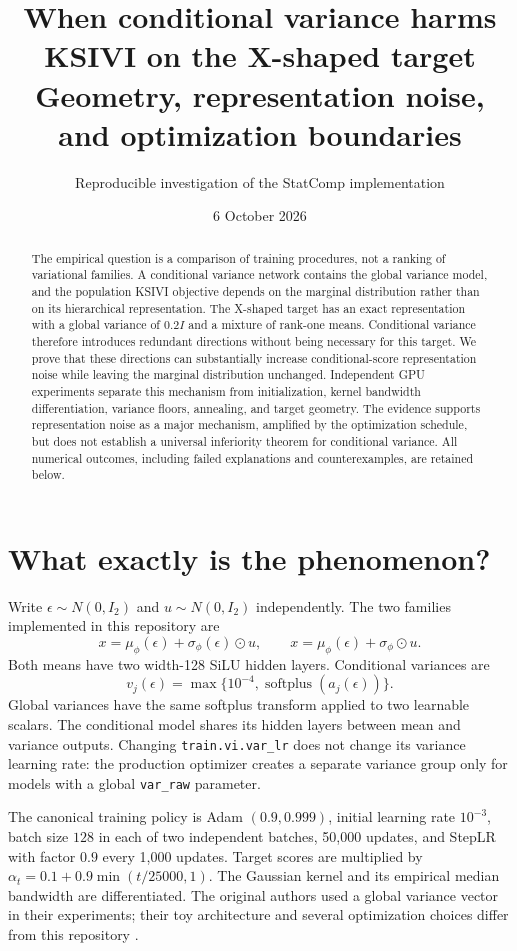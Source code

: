 \documentclass[11pt,a4paper]{article}
\title{When conditional variance harms KSIVI on the X-shaped target\\
\large Geometry, representation noise, and optimization boundaries}
\author{Reproducible investigation of the StatComp implementation}
\date{6 October 2026}
\numberwithin{equation}{section}
\begin{document}
\maketitle
\begin{abstract}
The empirical question is a comparison of training procedures, not a ranking
of variational families. A conditional variance network contains the global
variance model, and the population KSIVI objective depends on the marginal
distribution rather than on its hierarchical representation. The X-shaped
target has an exact representation with a global variance of $0.2I$ and a
mixture of rank-one means. Conditional variance therefore introduces redundant
directions without being necessary for this target. We prove that these
directions can substantially increase conditional-score representation noise
while leaving the marginal distribution unchanged. Independent GPU experiments
separate this mechanism from initialization, kernel bandwidth differentiation,
variance floors, annealing, and target geometry. The evidence supports
representation noise as a major mechanism, amplified by the optimization
schedule, but does not establish a universal inferiority theorem for
conditional variance. All numerical outcomes, including failed explanations
and counterexamples, are retained below.
\end{abstract}

\section{What exactly is the phenomenon?}
Write $\epsilon\sim N(0,I_2)$ and $u\sim N(0,I_2)$ independently. The two
families implemented in this repository are
\[
 x=\mu_\phi(\epsilon)+\sigma_\phi(\epsilon)\odot u,
 \qquad
 x=\mu_\phi(\epsilon)+\sigma_\phi\odot u.
\]
Both means have two width-128 SiLU hidden layers. Conditional variances are
\[
v_j(\epsilon)=\max\{10^{-4},\operatorname{softplus}(a_j(\epsilon))\}.
\]
Global variances have the same softplus transform applied to two learnable
scalars. The conditional model shares its hidden layers between mean and
variance outputs. Changing \texttt{train.vi.var\_lr} does not change its
variance learning rate: the production optimizer creates a separate variance
group only for models with a global \texttt{var\_raw} parameter.

The canonical training policy is Adam $(0.9,0.999)$, initial learning rate
$10^{-3}$, batch size $128$ in each of two independent batches, 50,000 updates,
and StepLR with factor $0.9$ every 1,000 updates. Target scores are multiplied
by $\alpha_t=0.1+0.9\min(t/25000,1)$. The Gaussian kernel and its empirical
median bandwidth are differentiated. The original authors used a global
variance vector in their experiments; their toy architecture and several
optimization choices differ from this repository \cite{cheng,yu}.
\end{document}
